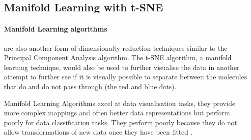 \documentclass[a4paper,12pt]{report}
\begin{document}
	
	
		\subsection{Manifold Learning with t-SNE}
		\paragraph{Manifold Learning algorithms} are also another form of dimensionalty reduction techniques similar to the Principal Component Analysis algorithm. The t-SNE algorithm, a manifold learning technique, would also be used to further visualise the data in another attempt to further see if it is visually possible to separate between the molecules that do and do not pass through (the red and blue dots). 
		
		Manifold Learning Algorithms excel at data visualisation tasks, they provide more complex mappings and often better data representations but perform poorly for data classification tasks. They perform poorly because they do not allow transformations of new data once they have been fitted \cite{Yairetal2008}.\\
		
\end{document}
